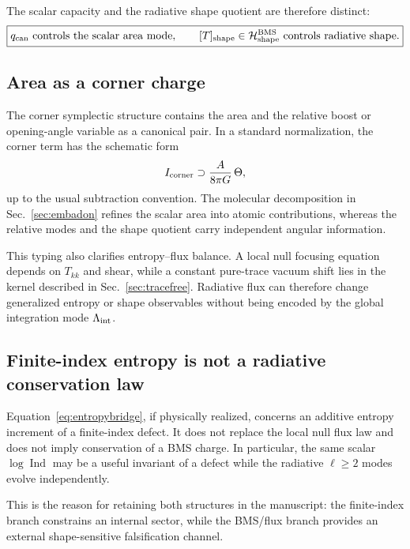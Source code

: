 \documentclass[aps,prd,preprint,nofootinbib,superscriptaddress]{revtex4-2}
\theoremstyle{definition}
\theoremstyle{remark}
\newcommand{\Ind}{\operatorname{Ind}}
\newcommand{\cH}{\mathcal H}
\begin{document}
The scalar capacity and the radiative shape quotient are therefore distinct:
\begin{equation}
\boxed{
q_{\rm can}\ {\rm controls\ the\ scalar\ area\ mode},
\qquad
[T]_{\rm shape}\in\cH_{\rm shape}^{\rm BMS}
\ {\rm controls\ radiative\ shape}.
}
\label{eq:scalarshape}
\end{equation}

\subsection{Area as a corner charge}

The corner symplectic structure contains the area and the relative boost or
opening-angle variable as a canonical pair.  In a standard normalization, the
corner term has the schematic form
\begin{equation}
I_{\rm corner}
\supset
\frac{A}{8\pi G}\,\Theta,
\label{eq:cornerboost}
\end{equation}
up to the usual subtraction convention.  The molecular decomposition in
Sec.~\ref{sec:embadon} refines the scalar area into atomic contributions,
whereas the relative modes and the shape quotient carry independent angular
information.

This typing also clarifies entropy--flux balance.  A local null focusing
equation depends on $T_{kk}$ and shear, while a constant pure-trace vacuum
shift lies in the kernel described in Sec.~\ref{sec:tracefree}.  Radiative
flux can therefore change generalized entropy or shape observables without
being encoded by the global integration mode $\Lambda_{\rm int}$.

\subsection{Finite-index entropy is not a radiative conservation law}

Equation~\eqref{eq:entropybridge}, if physically realized, concerns an
additive entropy increment of a finite-index defect.  It does not replace the
local null flux law and does not imply conservation of a BMS charge.  In
particular, the same scalar $\log\Ind$ may be a useful invariant of a defect
while the radiative $\ell\ge2$ modes evolve independently.

This is the reason for retaining both structures in the manuscript: the
finite-index branch constrains an internal sector, while the BMS/flux branch
provides an external shape-sensitive falsification channel.
\end{document}
